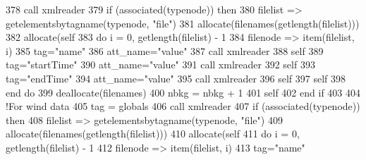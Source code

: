 \begin{DoxyCode}
378         \textcolor{keyword}{call }xmlreader%
379         \textcolor{keywordflow}{if} (\textcolor{keyword}{associated}(typenode)) \textcolor{keywordflow}{then}
380             filelist => getelementsbytagname(typenode, \textcolor{stringliteral}{"file"})
381             \textcolor{keyword}{allocate}(filenames(getlength(filelist)))
382             \textcolor{keyword}{allocate}(self%
383             \textcolor{keywordflow}{do} i = 0, getlength(filelist) - 1
384                 filenode => item(filelist, i)
385                 tag=\textcolor{stringliteral}{"name"}
386                 att\_name=\textcolor{stringliteral}{"value"}
387                 \textcolor{keyword}{call }xmlreader%
388                 self%
389                 tag=\textcolor{stringliteral}{"startTime"}
390                 att\_name=\textcolor{stringliteral}{"value"}
391                 \textcolor{keyword}{call }xmlreader%
392                 self%
393                 tag=\textcolor{stringliteral}{"endTime"}
394                 att\_name=\textcolor{stringliteral}{"value"}
395                 \textcolor{keyword}{call }xmlreader%
396                 self%
397                 self%
398 \textcolor{keywordflow}{            end do}
399             \textcolor{keyword}{deallocate}(filenames)
400             nbkg = nbkg + 1
401             self%
402 \textcolor{keywordflow}{        end if}
403 
404         \textcolor{comment}{!For wind data}
405         tag = globals%
406         \textcolor{keyword}{call }xmlreader%
407         \textcolor{keywordflow}{if} (\textcolor{keyword}{associated}(typenode)) \textcolor{keywordflow}{then}
408             filelist => getelementsbytagname(typenode, \textcolor{stringliteral}{"file"})
409             \textcolor{keyword}{allocate}(filenames(getlength(filelist)))
410             \textcolor{keyword}{allocate}(self%
411             \textcolor{keywordflow}{do} i = 0, getlength(filelist) - 1
412                 filenode => item(filelist, i)
413                 tag=\textcolor{stringliteral}{"name"}

\end{DoxyCode}
